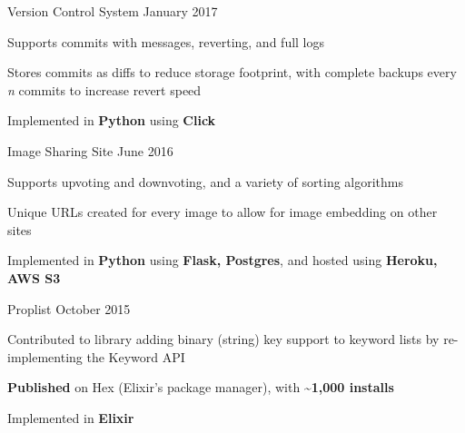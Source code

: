 \begin{cventries}
    \cventry
    {Version Control System} %
    {} %
    {}{January 2017}{
        \begin{cvitems} %
            \item {Supports commits with messages, reverting, and full logs}
            \item {Stores commits as diffs to reduce storage footprint, with complete backups every \textit{n} commits to increase revert speed}
            \item {Implemented in \textbf{Python} using \textbf{Click}}
        \end{cvitems}
    }

    \cventry
    {Image Sharing Site} %
    {} %
    {}{June 2016}{
        \begin{cvitems} %
            \item {Supports upvoting and downvoting, and a variety of sorting algorithms}
            \item {Unique URLs created for every image to allow for image embedding on other sites}
            \item {Implemented in \textbf{Python} using \textbf{Flask, Postgres}, and hosted using \textbf{Heroku, AWS S3}}
        \end{cvitems}
    }

    \cventry
    {Proplist} %
    {} %
    {}{October 2015}{
        \begin{cvitems} %
            \item {Contributed to library adding binary (string) key support to keyword lists by re-implementing the Keyword API}
            \item {\textbf{Published} on Hex (Elixir's package manager), with \textbf{\textasciitilde1,000 installs}}
            \item {Implemented in \textbf{Elixir}}
        \end{cvitems}
    }

\end{cventries}
